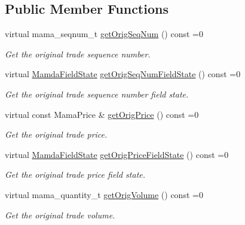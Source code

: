 \subsection*{Public Member Functions}
\begin{CompactItemize}
\item 
virtual mama\_\-seqnum\_\-t \hyperlink{classWombat_1_1MamdaTradeCorrection_fcec3aec725d1d8fdcb304769f42ddab}{get\-Orig\-Seq\-Num} () const =0
\begin{CompactList}\small\item\em Get the original trade sequence number. \item\end{CompactList}\item 
virtual \hyperlink{namespaceWombat_93aac974f2ab713554fd12a1fa3b7d2a}{Mamda\-Field\-State} \hyperlink{classWombat_1_1MamdaTradeCorrection_7457f71235c7026bc40a3c2fced22c3f}{get\-Orig\-Seq\-Num\-Field\-State} () const =0
\begin{CompactList}\small\item\em Get the original trade sequence number field state. \item\end{CompactList}\item 
virtual const Mama\-Price \& \hyperlink{classWombat_1_1MamdaTradeCorrection_d458a3b2957ac56a51c345ab02d3dd49}{get\-Orig\-Price} () const =0
\begin{CompactList}\small\item\em Get the original trade price. \item\end{CompactList}\item 
virtual \hyperlink{namespaceWombat_93aac974f2ab713554fd12a1fa3b7d2a}{Mamda\-Field\-State} \hyperlink{classWombat_1_1MamdaTradeCorrection_92204206fdf0c2a7f86aab54305ff571}{get\-Orig\-Price\-Field\-State} () const =0
\begin{CompactList}\small\item\em Get the original trade price field state. \item\end{CompactList}\item 
virtual mama\_\-quantity\_\-t \hyperlink{classWombat_1_1MamdaTradeCorrection_6edddd525ed1c6875e7d39f1e3d391f8}{get\-Orig\-Volume} () const =0
\begin{CompactList}\small\item\em Get the original trade volume. \item\end{CompactList}\item 

\end{CompactItemize}
